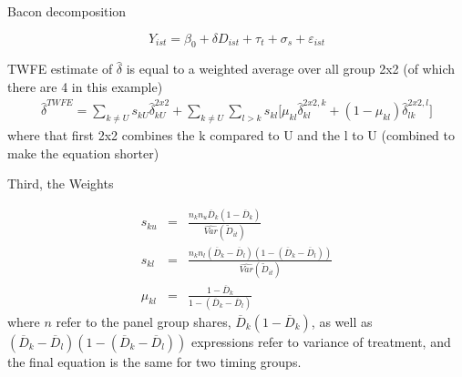 \documentclass{beamer}
\begin{document}
\begin{frame}{Bacon decomposition}

$$Y_{ist} = \beta_0 + \delta D_{ist} + \tau_t + \sigma_s + \varepsilon_{ist}$$


TWFE estimate of $\widehat{\delta}$ is equal to a weighted average over all group 2x2 (of which there are 4 in this example)
\begin{eqnarray*}	
\widehat{\delta}^{TWFE} = \sum_{k \neq U} s_{kU}\widehat{\delta}_{kU}^{2x2} + \sum_{k \neq U} \sum_{l>k} s_{kl}  \bigg [ \mu_{kl}\widehat{\delta}_{kl}^{2x2,k} + (1-\mu_{kl}) \widehat{\delta}_{lk}^{2x2,l} \bigg]
\end{eqnarray*}where that first 2x2 combines the k compared to U and the l to U (combined to make the equation shorter)

\end{frame}
	


\begin{frame}{Third, the Weights}

 \begin{eqnarray*} s_{ku} &=& \frac{ n_k n_u \overline{D}_k (1- \overline{D}_k ) }{ \widehat{Var} ( \tilde{D}_{it} )} \\
s_{kl} &=& \frac{ n_k n_l (\overline{D}_k - \overline{D}_{l} ) ( 1- ( \overline{D}_k - \overline{D}_{l} )) }{\widehat{Var}(\tilde{D}_{it})} \\
\mu_{kl} &=& \frac{1 - \overline{D}_k }{1 - ( \overline{D}_k - \overline{D}_{l} )}
\end{eqnarray*}where $n$ refer to the panel group shares, $\overline{D}_k (1- \overline{D}_k )$, as well as $(\overline{D}_k - \overline{D}_{l} ) ( 1- ( \overline{D}_k - \overline{D}_{l} ))$ expressions refer to variance of treatment, and the final equation is the same for two timing groups.

\end{frame}
\end{document}
